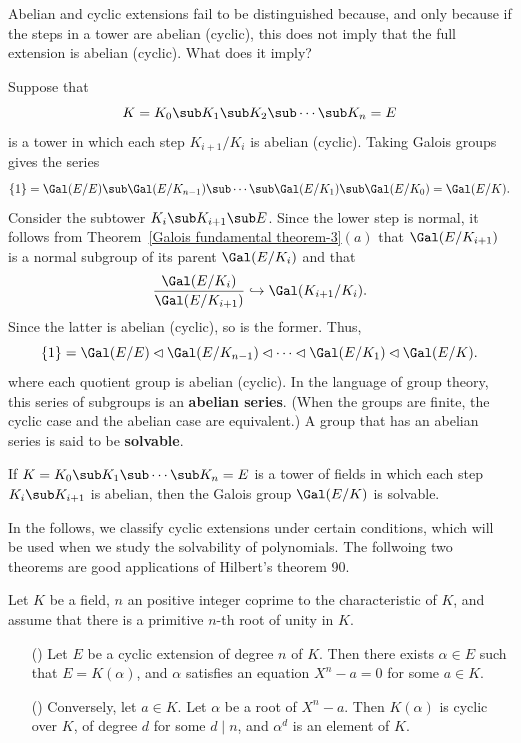 Abelian and cyclic extensions fail to be distinguished because, and only because if the steps in a tower are abelian (cyclic), this does not imply that the full extension is abelian (cyclic). What does it imply?\par
Suppose that
\[K=K_0\sub K_1\sub K_2\sub\cdots\sub K_{n}=E\]
is a tower in which each step $K_{i+1}/K_i$ is abelian (cyclic). Taking Galois groups gives the series
\[\{1\}=\Gal(E/E)\sub\Gal(E/K_{n-1})\sub\cdots\sub\Gal(E/K_1)\sub \Gal(E/K_0)=\Gal(E/K).\]
Consider the subtower $K_i\sub K_{i+1}\sub E$. Since the lower step is normal, it follows from Theorem~\ref{Galois fundamental theorem-3}$(a)$ that $\Gal(E/K_{i+1})$ is a normal subgroup of its parent $\Gal(E/K_i)$ and that
\[\frac{\Gal(E/K_i)}{\Gal(E/K_{i+1})}\hookrightarrow\Gal(K_{i+1}/K_{i}).\]
Since the latter is abelian (cyclic), so is the former. Thus,
\[\{1\}=\Gal(E/E)\lhd\Gal(E/K_{n-1})\lhd\cdots\lhd\Gal(E/K_1)\lhd\Gal(E/K).\]
where each quotient group is abelian (cyclic). In the language of group theory, this series of subgroups is an \textbf{abelian series}. (When the groups are finite, the cyclic case and the abelian case are equivalent.) A group that has an abelian series is said to be \textbf{solvable}.
\begin{proposition}\label{Galois group of successive abelian extension is slovable}
If $K=K_0\sub K_1\sub\cdots\sub K_n=E$ is a tower of fields in which each step $K_{i}\sub K_{i+1}$ is abelian, then the Galois group $\Gal(E/K)$ is solvable.
\end{proposition}
In the follows, we classify cyclic extensions under certain conditions, which will be used when we study the solvability of polynomials. The follwoing two theorems are good applications of Hilbert's theorem 90.
\begin{theorem}\label{field ext cyclic nonchar case}
Let $K$ be a field, $n$ an positive integer coprime to the characteristic of $K$, and assume that there is a primitive $n$-th root of unity in $K$.
\begin{itemize}
\item[(\rmnum{1})] Let $E$ be a cyclic extension of degree $n$ of $K$. Then there exists $\alpha\in E$ such that $E=K(\alpha)$, and $\alpha$ satisfies an equation $X^n-a=0$ for some $a\in K$.
\item[(\rmnum{2})] Conversely, let $a\in K$. Let $\alpha$ be a root of $X^n-a$. Then $K(\alpha)$ is cyclic over $K$, of degree $d$ for some $d\mid n$, and $\alpha^d$ is an element of $K$.
\end{itemize}
\end{theorem}
